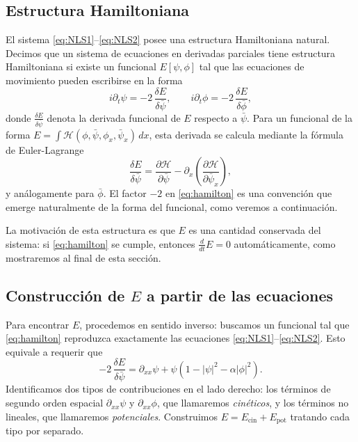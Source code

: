 \documentclass[letterpaper,11pt]{exam}
\theoremstyle{plain}
\begin{document}
\hspace{2mm}
\subsection*{Estructura Hamiltoniana}

El sistema \eqref{eq:NLS1}--\eqref{eq:NLS2} posee una estructura Hamiltoniana natural.
Decimos que un sistema de ecuaciones en derivadas parciales tiene estructura Hamiltoniana
si existe un funcional $E[\psi, \phi]$ tal que las ecuaciones de movimiento pueden escribirse
en la forma
\begin{equation}\label{eq:hamilton}
    i\partial_t\psi = -2\,\frac{\delta E}{\delta\bar{\psi}}, \qquad
    i\partial_t\phi = -2\,\frac{\delta E}{\delta\bar{\phi}},
\end{equation}
donde $\frac{\delta E}{\delta\bar{\psi}}$ denota la derivada funcional de $E$ respecto
a $\bar{\psi}$. Para un funcional de la forma $E = \int \mathcal{H}(\phi,\bar{\psi},\phi_x,\bar{\psi}_x)\,dx$,
esta derivada se calcula mediante la fórmula de Euler-Lagrange
\begin{equation}\label{eq:EL}
    \frac{\delta E}{\delta\bar{\psi}}
    = \frac{\partial\mathcal{H}}{\partial\bar{\psi}}
    - \partial_x\!\left(\frac{\partial\mathcal{H}}{\partial\bar{\psi}_x}\right),
\end{equation}
y análogamente para $\bar{\phi}$. El factor $-2$ en \eqref{eq:hamilton} es una convención
que emerge naturalmente de la forma del funcional, como veremos a continuación.

La motivación de esta estructura es que $E$ es una cantidad conservada del sistema:
si \eqref{eq:hamilton} se cumple, entonces $\frac{d}{dt}E = 0$ automáticamente,
como mostraremos al final de esta sección.

\subsection*{Construcción de $E$ a partir de las ecuaciones}

Para encontrar $E$, procedemos en sentido inverso: buscamos un funcional tal que
\eqref{eq:hamilton} reproduzca exactamente las ecuaciones \eqref{eq:NLS1}--\eqref{eq:NLS2}.
Esto equivale a requerir que
\begin{equation}
    -2\,\frac{\delta E}{\delta\bar{\psi}}
    = \partial_{xx}\psi + \psi(1 - |\psi|^2 - \alpha|\phi|^2).
\end{equation}
Identificamos dos tipos de contribuciones en el lado derecho: los términos de segundo orden
espacial $\partial_{xx}\psi$ y $\partial_{xx}\phi$, que llamaremos \emph{cinéticos}, y los
términos no lineales, que llamaremos \emph{potenciales}. Construimos $E = E_{\mathrm{cin}} + E_{\mathrm{pot}}$
tratando cada tipo por separado.
\end{document}
